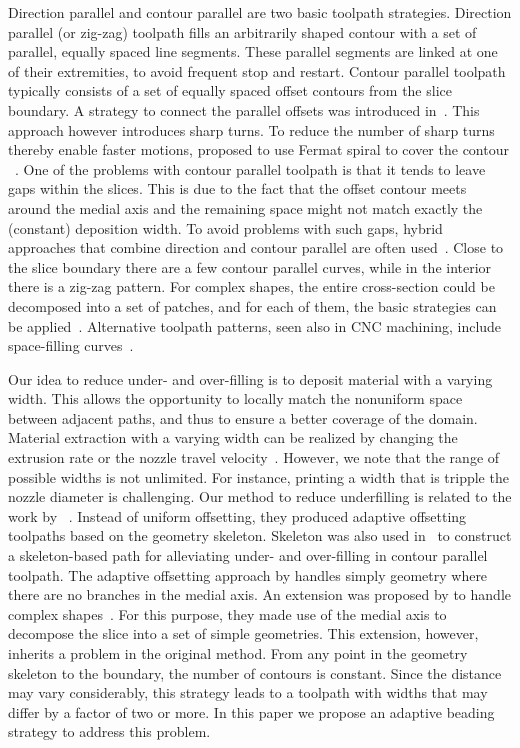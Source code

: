 Direction parallel and contour parallel are two basic toolpath strategies.
Direction parallel (or zig-zag) toolpath fills an arbitrarily shaped contour with a set of parallel, equally spaced line segments.
These parallel segments are linked at one of their extremities, to avoid frequent stop and restart.
Contour parallel toolpath typically consists of a set of equally spaced offset contours from the slice boundary.
A strategy to connect the parallel offsets was introduced in~\cite{KUIPERS2019CAD}. This approach however introduces sharp turns.
To reduce the number of sharp turns thereby enable faster motions, \citeauthor{Zhao2016} proposed to use Fermat spiral to cover the contour ~\cite{Zhao2016}.
One of the problems with contour parallel toolpath is that it tends to leave gaps within the slices.
This is due to the fact that the offset contour meets around the medial axis and the remaining space might not match exactly the (constant) deposition width.
To avoid problems with such gaps, hybrid approaches that combine direction and contour parallel are often used~\cite{Mcmains2000DETC,Jin2013adaptive}.
Close to the slice boundary there are a few contour parallel curves, while in the interior there is a zig-zag pattern.
For complex shapes, the entire cross-section could be decomposed into a set of patches, and for each of them, the basic strategies can be applied~\cite{Ding2014,Jin2017JCIM}.
Alternative toolpath patterns, seen also in CNC machining, include space-filling curves~\cite{Cox1994CAD,Griffiths1994,Shaikh2016}.

Our idea to reduce under- and over-filling is to deposit material with a varying width.
This allows the opportunity to locally match the nonuniform space between adjacent paths, and thus to ensure a better coverage of the domain.
Material extraction with a varying width can be realized by changing the extrusion rate or the nozzle travel velocity~\cite{Ertay2018,Kuipers2018}.
However, we note that the range of possible widths is not unlimited.
For instance, printing a width that is tripple the nozzle diameter is challenging.
Our method to reduce underfilling is related to the work by \citeauthor{kao1998optimal}~\cite{kao1998optimal}.
Instead of uniform offsetting, they produced adaptive offsetting toolpaths based on the geometry skeleton. 
Skeleton was also used in~\cite{Jin2017} to construct a skeleton-based path for alleviating under- and over-filling in contour parallel toolpath. 
The adaptive offsetting approach by \citeauthor{kao1998optimal} handles simply geometry where there are no branches in the medial axis.
An extension was proposed by \citeauthor{Ding2016a} to handle complex shapes~\cite{Ding2016a}.
For this purpose, they made use of the medial axis to decompose the slice into a set of simple geometries.
This extension, however, inherits a problem in the original method.
From any point in the geometry skeleton to the boundary, the number of contours is constant.
Since the distance may vary considerably, this strategy leads to a toolpath with widths that may differ by a factor of two or more.
In this paper we propose an adaptive beading strategy to address this problem. 

